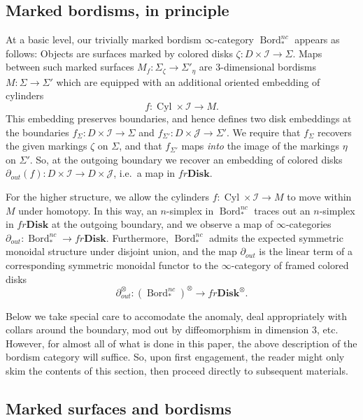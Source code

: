 \documentclass[reqno]{amsart}
\theoremstyle{definition}
\newcommand{\mcl}[1]{\mathcal{#1}}
\newcommand{\opn}[1]{\operatorname{#1}}
\newcommand{\ot}{\otimes}
\newcommand{\Disk}{\mathbf{Disk}}
\DeclareMathOperator{\Bord}{Bord}
\renewcommand{\1}{\mathbf{1}}
\begin{document}
\subsection{Marked bordisms, in principle}
\label{sect:bord_principles}

At a basic level, our trivially marked bordism $\infty$-category $\Bord_{\ast}^{nc}$ appears as follows: Objects are surfaces marked by colored disks $\zeta:D\times \mcl{I}\to \Sigma$.  Maps between such marked surfaces $M_f:\Sigma_{\zeta}\to \Sigma'_{\eta}$ are $3$-dimensional bordisms $M:\Sigma\to \Sigma'$ which are equipped with an additional oriented embedding of cylinders
\[
f:\opn{Cyl}\times \mcl{I}\to M.
\]
This embedding preserves boundaries, and hence defines two disk embeddings at the boundaries $f_{\Sigma}:D\times \mcl{I}\to\Sigma$ and $f_{\Sigma'}:D\times \mcl{J}\to \Sigma'$.  We require that $f_{\Sigma}$ recovers the given markings $\zeta$ on $\Sigma$, and that $f_{\Sigma'}$ maps \emph{into} the image of the markings $\eta$ on $\Sigma'$. So, at the outgoing boundary we recover an embedding of colored disks $\partial_{out}(f):D\times\mcl{I}\to D\times \mcl{J}$, i.e.\ a map in $fr\Disk$.
\par

For the higher structure, we allow the cylinders $f:\opn{Cyl}\times \mcl{I}\to M$ to move within $M$ under homotopy.  In this way, an $n$-simplex in $\Bord_{\ast}^{nc}$ traces out an $n$-simplex in $fr\Disk$ at the outgoing boundary, and we observe a map of $\infty$-categories $\partial_{out}:\Bord_{\ast}^{nc}\to fr\Disk$.  Furthermore, $\Bord_{\ast}^{nc}$ admits the expected symmetric monoidal structure under disjoint union, and the map $\partial_{out}$ is the linear term of a corresponding symmetric monoidal functor to the $\infty$-category of framed colored disks
\[
\partial_{out}^{\ot}:(\Bord_{\ast}^{nc})^{\ot}\to fr\Disk^{\ot}.
\]
\par

Below we take special care to accomodate the anomaly, deal appropriately with collars around the boundary, mod out by diffeomorphism in dimension $3$, etc. However, for almost all of what is done in this paper, the above description of the bordism category will suffice. So, upon first engagement, the reader might only skim the contents of this section, then proceed directly to subsequent materials.

\subsection{Marked surfaces and bordisms}
\label{sect:bordisms}
\end{document}
